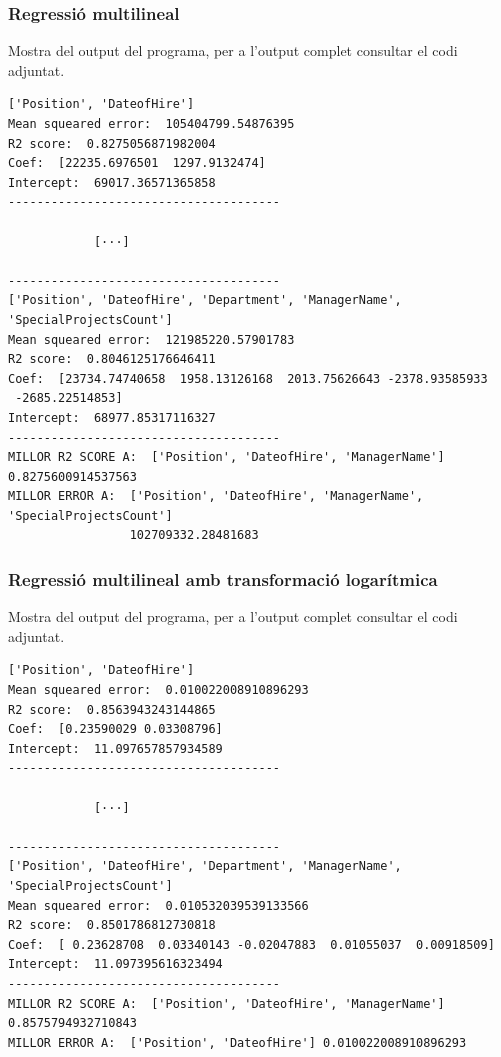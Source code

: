 \documentclass[a4paper, 11pt]{article}
\begin{document}
\newpage
\subsubsection{Regressió multilineal} \label{reg_multi}
Mostra del output del programa, per a l'output complet consultar el codi adjuntat.

\begin{verbatim}
['Position', 'DateofHire']
Mean squeared error:  105404799.54876395
R2 score:  0.8275056871982004
Coef:  [22235.6976501  1297.9132474]
Intercept:  69017.36571365858
--------------------------------------

            [···]

--------------------------------------
['Position', 'DateofHire', 'Department', 'ManagerName', 'SpecialProjectsCount']
Mean squeared error:  121985220.57901783
R2 score:  0.8046125176646411
Coef:  [23734.74740658  1958.13126168  2013.75626643 -2378.93585933
 -2685.22514853]
Intercept:  68977.85317116327
--------------------------------------
MILLOR R2 SCORE A:  ['Position', 'DateofHire', 'ManagerName'] 0.8275600914537563
MILLOR ERROR A:  ['Position', 'DateofHire', 'ManagerName', 'SpecialProjectsCount'] 
                 102709332.28481683
\end{verbatim}
\subsubsection{Regressió multilineal amb transformació logarítmica} \label{reg_multi_log}
Mostra del output del programa, per a l'output complet consultar el codi adjuntat.

\begin{verbatim}
['Position', 'DateofHire']
Mean squeared error:  0.010022008910896293
R2 score:  0.8563943243144865
Coef:  [0.23590029 0.03308796]
Intercept:  11.097657857934589
--------------------------------------

            [···]

--------------------------------------
['Position', 'DateofHire', 'Department', 'ManagerName', 'SpecialProjectsCount']
Mean squeared error:  0.010532039539133566
R2 score:  0.8501786812730818
Coef:  [ 0.23628708  0.03340143 -0.02047883  0.01055037  0.00918509]
Intercept:  11.097395616323494
--------------------------------------
MILLOR R2 SCORE A:  ['Position', 'DateofHire', 'ManagerName'] 0.8575794932710843
MILLOR ERROR A:  ['Position', 'DateofHire'] 0.010022008910896293    
\end{verbatim}
\newpage
\end{document}
